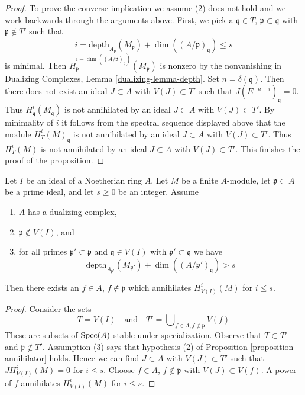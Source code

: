 \begin{proof}
\medskip\noindent
To prove the converse implication we assume (2) does not hold
and we work backwards through the arguments above. First, we pick a
$\mathfrak q \in T$, $\mathfrak p \subset \mathfrak q$
with $\mathfrak p \not \in T'$ such that
$$
i = \text{depth}_{A_\mathfrak p}(M_\mathfrak p) +
\dim((A/\mathfrak p)_\mathfrak q) \leq s
$$
is minimal. Then
$H^{i - \dim((A/\mathfrak p)_\mathfrak q)}_\mathfrak p(M_\mathfrak p)$
is nonzero by the nonvanishing in
Dualizing Complexes, Lemma \ref{dualizing-lemma-depth}.
Set $n = \delta(\mathfrak q)$. Then
there does not exist an ideal $J \subset A$ with $V(J) \subset T'$
such that $J(E^{-n - i})_\mathfrak q = 0$.
Thus $H^i_\mathfrak q(M_\mathfrak q)$ is not
annihilated by an ideal $J \subset A$ with $V(J) \subset T'$.
By minimality of $i$ it follows from the spectral sequence displayed above
that the module $H^i_T(M)_\mathfrak q$
is not annihilated by an ideal $J \subset A$
with $V(J) \subset T'$. Thus $H^i_T(M)$
is not annihilated by an ideal $J \subset A$
with $V(J) \subset T'$. This finishes the proof of the proposition.
\end{proof}

\begin{lemma}
\label{lemma-kill-local-cohomology-at-prime}
Let $I$ be an ideal of a Noetherian ring $A$.
Let $M$ be a finite $A$-module, let $\mathfrak p \subset A$ be a prime
ideal, and let $s \geq 0$ be an integer. Assume
\begin{enumerate}
\item $A$ has a dualizing complex,
\item $\mathfrak p \not \in V(I)$, and
\item for all primes $\mathfrak p' \subset \mathfrak p$
and $\mathfrak q \in V(I)$ with $\mathfrak p' \subset \mathfrak q$ we have
$$
\text{depth}_{A_{\mathfrak p'}}(M_{\mathfrak p'}) +
\dim((A/\mathfrak p')_\mathfrak q) > s
$$
\end{enumerate}
Then there exists an $f \in A$, $f \not \in \mathfrak p$ which annihilates
$H^i_{V(I)}(M)$ for $i \leq s$.
\end{lemma}

\begin{proof}
Consider the sets
$$
T = V(I)
\quad\text{and}\quad
T' = \bigcup\nolimits_{f \in A, f \not \in \mathfrak p} V(f)
$$
These are subsets of $\mathop{\mathrm{Spec}}(A)$ stable under specialization.
Observe that $T \subset T'$ and $\mathfrak p \not \in T'$.
Assumption (3) says that hypothesis (2) of
Proposition \ref{proposition-annihilator} holds.
Hence we can find $J \subset A$ with $V(J) \subset T'$
such that $J H^i_{V(I)}(M) = 0$ for $i \leq s$.
Choose $f \in A$, $f \not \in \mathfrak p$ with $V(J) \subset V(f)$.
A power of $f$ annihilates $H^i_{V(I)}(M)$ for $i \leq s$.
\end{proof}





